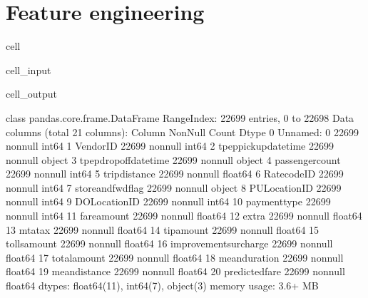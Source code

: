 \documentclass[letterpaper,10pt,english]{sphinxmanual}
\begin{document}
\section{Feature engineering}
\label{\detokenize{Automatidata_Machine Learning:feature-engineering}}
\begin{sphinxuseclass}{cell}
\begin{sphinxuseclass}{cell_input}
\begin{sphinxVerbatim}[commandchars=\\\{\}]
\end{sphinxVerbatim}

\end{sphinxuseclass}
\begin{sphinxuseclass}{cell_output}
\begin{sphinxVerbatim}[commandchars=\\\{\}]
\PYGZlt{}class \PYGZsq{}pandas.core.frame.DataFrame\PYGZsq{}\PYGZgt{}
RangeIndex: 22699 entries, 0 to 22698
Data columns (total 21 columns):
 \PYGZsh{}   Column                 Non\PYGZhy{}Null Count  Dtype  
\PYGZhy{}\PYGZhy{}\PYGZhy{}  \PYGZhy{}\PYGZhy{}\PYGZhy{}\PYGZhy{}\PYGZhy{}\PYGZhy{}                 \PYGZhy{}\PYGZhy{}\PYGZhy{}\PYGZhy{}\PYGZhy{}\PYGZhy{}\PYGZhy{}\PYGZhy{}\PYGZhy{}\PYGZhy{}\PYGZhy{}\PYGZhy{}\PYGZhy{}\PYGZhy{}  \PYGZhy{}\PYGZhy{}\PYGZhy{}\PYGZhy{}\PYGZhy{}  
 0   Unnamed: 0             22699 non\PYGZhy{}null  int64  
 1   VendorID               22699 non\PYGZhy{}null  int64  
 2   tpep\PYGZus{}pickup\PYGZus{}datetime   22699 non\PYGZhy{}null  object 
 3   tpep\PYGZus{}dropoff\PYGZus{}datetime  22699 non\PYGZhy{}null  object 
 4   passenger\PYGZus{}count        22699 non\PYGZhy{}null  int64  
 5   trip\PYGZus{}distance          22699 non\PYGZhy{}null  float64
 6   RatecodeID             22699 non\PYGZhy{}null  int64  
 7   store\PYGZus{}and\PYGZus{}fwd\PYGZus{}flag     22699 non\PYGZhy{}null  object 
 8   PULocationID           22699 non\PYGZhy{}null  int64  
 9   DOLocationID           22699 non\PYGZhy{}null  int64  
 10  payment\PYGZus{}type           22699 non\PYGZhy{}null  int64  
 11  fare\PYGZus{}amount            22699 non\PYGZhy{}null  float64
 12  extra                  22699 non\PYGZhy{}null  float64
 13  mta\PYGZus{}tax                22699 non\PYGZhy{}null  float64
 14  tip\PYGZus{}amount             22699 non\PYGZhy{}null  float64
 15  tolls\PYGZus{}amount           22699 non\PYGZhy{}null  float64
 16  improvement\PYGZus{}surcharge  22699 non\PYGZhy{}null  float64
 17  total\PYGZus{}amount           22699 non\PYGZhy{}null  float64
 18  mean\PYGZus{}duration          22699 non\PYGZhy{}null  float64
 19  mean\PYGZus{}distance          22699 non\PYGZhy{}null  float64
 20  predicted\PYGZus{}fare         22699 non\PYGZhy{}null  float64
dtypes: float64(11), int64(7), object(3)
memory usage: 3.6+ MB
\end{sphinxVerbatim}

\end{sphinxuseclass}
\end{sphinxuseclass}
\end{document}
